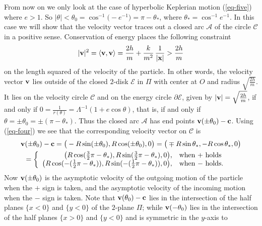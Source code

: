 \documentclass[11pt,openbib]{article}
\newcommand{\ttfrac}[2]{\mbox{$\frac{{\scriptstyle #1}}{{\scriptstyle #2}}$}}
\begin{document}
\noindent From now on we only 
look at the case of hyperbolic Keplerian motion (\ref{eq-five}) where 
$e > 1$. So $|\theta | < {\theta }_0 = {\cos }^{-1}\big( -e^{-1} \big) = \pi - {\theta }_{\ast }$, where ${\theta }_{\ast } = 
{\cos }^{-1}e^{-1}$. In this case we will show that the velocity vector traces out a closed arc $\mathcal{A}$ of the 
circle $\mathcal{C}$ in a positive sense. Conservation of energy places the following constraint 
\begin{equation}
|{\bf v}|^2 = \langle {\bf v}, {\bf v} \rangle = \frac{2h}{m} +\frac{k}{m^2} \, \frac{1}{|{\bf x}|} > \frac{2h}{m} 
\label{eq-six}
\end{equation}
on the length squared of the velocity of the particle. In other words, the velocity vector ${\bf v}$ lies outside of the closed $2$-disk $\mathcal{E}$ in $\Pi $ with center at $O$ and 
radius $\sqrt{\frac{2h}{m}}$. It lies on the velocity circle $\mathcal{C}$ and on the energy circle $\partial \mathcal{E}$, given by $|{\bf v}| = \sqrt{\frac{2h}{m}}$, if and only if $0 = \frac{1}{r(\theta )} = {\Lambda }^{-1}(1+e\cos \theta )$, that is, 
if and only if $\theta = \pm {\theta }_0 = \pm (\pi - {\theta }_{\ast})$. Thus the closed arc $\mathcal{A}$ has 
end points ${\bf v}(\pm {\theta }_0)-{\bf c}$. Using (\ref{eq-four}) we see that the 
corresponding velocity vector on $\mathcal{C}$ is 
\begin{align}
{\bf v}(\pm {\theta }_0) - {\bf c} & = \big( -R \sin (\pm {\theta }_0), R \cos (\pm {\theta }_0), 0 \big) = 
\big( \mp R \sin {\theta }_{\ast} , -R \cos {\theta }_{\ast }, 0 \big) \notag \\
&\hspace{-.6in} = \left\{ \begin{array}{rl} 
\big( R \cos (\ttfrac{3}{2} \pi  - {\theta }_{\ast }), R \sin (\ttfrac{3}{2} \pi - {\theta }_{\ast }), 0 \big), & \mbox{when $+$ holds} \\
\big( R \cos (-(\ttfrac{1}{2} \pi - {\theta }_{\ast })), R \sin (-(\ttfrac{1}{2} \pi  - {\theta }_{\ast })), 0 \big), & \mbox{when $-$ holds.} 
\end{array} \right. 
\label{eq-seven}
\end{align}
Now ${\bf v}(\pm {\theta }_0)$ is the asymptotic velocity of the outgoing motion of the particle when the $+$ sign is taken, and the asymptotic velocity of the incoming motion when the $-$ sign is taken. Note that ${\bf v}({\theta }_0)-{\bf c}$ lies in the intersection of the half planes $\{ x < 0 \} $ and $\{ y < 0 \} $ of the $2$-plane $\Pi $; while ${\bf v}(-{\theta }_0)$ lies in the intersection of the half planes $\{ x > 0 \} $ and $\{ y < 0 \} $ and is symmetric in the $y$-axis to 
\end{document}
